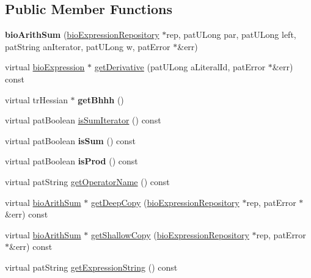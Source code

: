 \subsection*{Public Member Functions}
\begin{DoxyCompactItemize}
\item 
\mbox{\label{classbio_arith_sum_af5f0818c44873b2cb1c10769468dca23}} 
{\bfseries bio\+Arith\+Sum} (\hyperlink{classbio_expression_repository}{bio\+Expression\+Repository} $\ast$rep, pat\+U\+Long par, pat\+U\+Long left, pat\+String an\+Iterator, pat\+U\+Long w, pat\+Error $\ast$\&err)
\item 
virtual \hyperlink{classbio_expression}{bio\+Expression} $\ast$ \hyperlink{classbio_arith_sum_acefb2c0e91cdea5768b09aa17974c25e}{get\+Derivative} (pat\+U\+Long a\+Literal\+Id, pat\+Error $\ast$\&err) const
\item 
\mbox{\label{classbio_arith_sum_ae93d63173a732831f2eabb7bf3aca8e6}} 
virtual tr\+Hessian $\ast$ {\bfseries get\+Bhhh} ()
\item 
virtual pat\+Boolean \hyperlink{classbio_arith_sum_a57d25760240c2d93b414d79679cfa5a3}{is\+Sum\+Iterator} () const
\item 
\mbox{\label{classbio_arith_sum_a51e245ae7bcf17979c1207eefef8fc89}} 
virtual pat\+Boolean {\bfseries is\+Sum} () const
\item 
\mbox{\label{classbio_arith_sum_a988363e77af268da7f58101b662b644b}} 
virtual pat\+Boolean {\bfseries is\+Prod} () const
\item 
virtual pat\+String \hyperlink{classbio_arith_sum_a3bebc8a594c98febfad645befc1e6afa}{get\+Operator\+Name} () const
\item 
virtual \hyperlink{classbio_arith_sum}{bio\+Arith\+Sum} $\ast$ \hyperlink{classbio_arith_sum_ad32aa07569ab7c8f118a632f331e55d7}{get\+Deep\+Copy} (\hyperlink{classbio_expression_repository}{bio\+Expression\+Repository} $\ast$rep, pat\+Error $\ast$\&err) const
\item 
virtual \hyperlink{classbio_arith_sum}{bio\+Arith\+Sum} $\ast$ \hyperlink{classbio_arith_sum_ac2180e097ac045f893a789dd627b259a}{get\+Shallow\+Copy} (\hyperlink{classbio_expression_repository}{bio\+Expression\+Repository} $\ast$rep, pat\+Error $\ast$\&err) const
\item 
virtual pat\+String \hyperlink{classbio_arith_sum_ade9e163192f4124f802daf463d27faa4}{get\+Expression\+String} () const

\end{DoxyCompactItemize}
